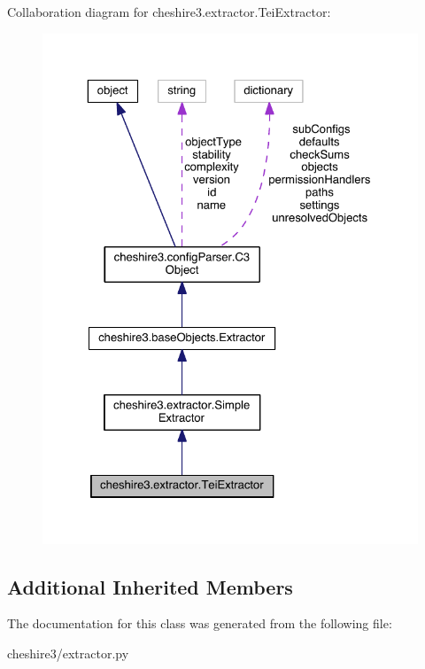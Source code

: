 Collaboration diagram for cheshire3.\-extractor.\-Tei\-Extractor\-:
\nopagebreak
\begin{figure}[H]
\begin{center}
\leavevmode
\includegraphics[width=325pt]{classcheshire3_1_1extractor_1_1_tei_extractor__coll__graph}
\end{center}
\end{figure}
\subsection*{Additional Inherited Members}


The documentation for this class was generated from the following file\-:\begin{DoxyCompactItemize}
\item 
cheshire3/extractor.\-py\end{DoxyCompactItemize}
